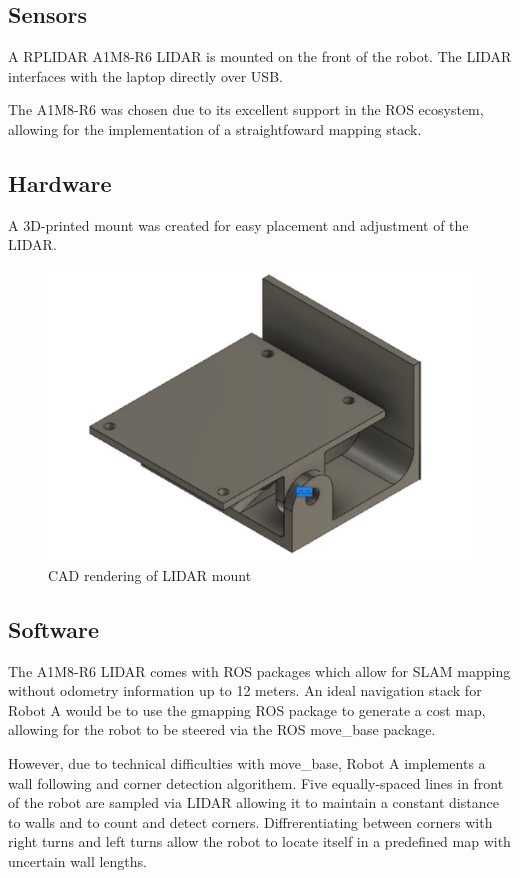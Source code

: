 \documentclass[11pt]{article}
\begin{document}
	\subsection{Sensors}
	A RPLIDAR A1M8-R6 LIDAR is mounted on the front of the robot. The LIDAR interfaces with the laptop directly over USB. \newline
	
	The A1M8-R6 was chosen due to its excellent support in the ROS ecosystem, allowing for the implementation of a straightfoward mapping stack. 
	
	\subsection{Hardware}
	A 3D-printed mount was created for easy placement and adjustment of the LIDAR.
	
	\begin{figure}[h!]
		\centering
		\includegraphics[scale=0.6]{lidar_mount}
		\caption{CAD rendering of LIDAR mount}
	\end{figure}
	
	\subsection{Software}
	The A1M8-R6 LIDAR comes with ROS packages which allow for SLAM mapping without odometry information up to 12 meters. An ideal navigation stack for Robot A would be to use the gmapping ROS package to generate a cost map, allowing for the robot to be steered via the ROS move\_base package. \newline
	
	However, due to technical difficulties with move\_base, Robot A implements a wall following and corner detection algorithem. Five equally-spaced lines in front of the robot are sampled via LIDAR allowing it to maintain a constant distance to walls and to count and detect corners. Diffrerentiating between corners with right turns and left turns allow the robot to locate itself in a predefined map with uncertain wall lengths.\newline
	
\end{document}
